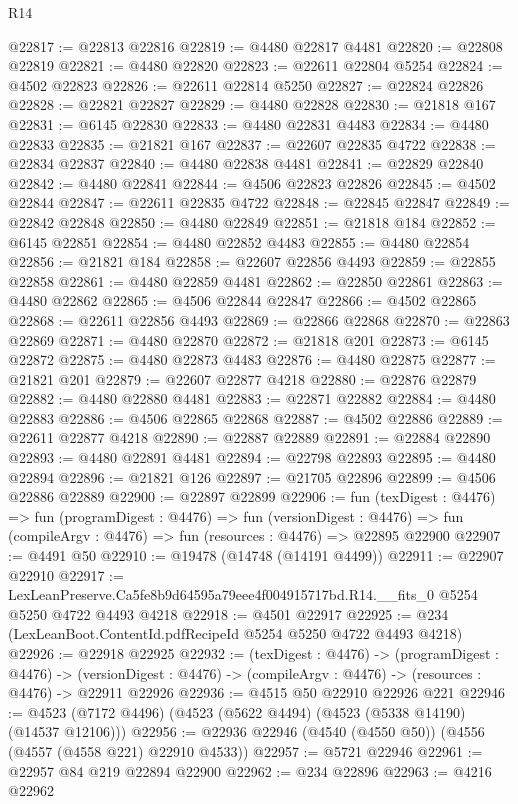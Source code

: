 \begin{lexlean}{R14}
\begin{coremodule}
@22817 := @22813 @22816
@22819 := @4480 @22817 @4481
@22820 := @22808 @22819
@22821 := @4480 @22820
@22823 := @22611 @22804 @5254
@22824 := @4502 @22823
@22826 := @22611 @22814 @5250
@22827 := @22824 @22826
@22828 := @22821 @22827
@22829 := @4480 @22828
@22830 := @21818 @167
@22831 := @6145 @22830
@22833 := @4480 @22831 @4483
@22834 := @4480 @22833
@22835 := @21821 @167
@22837 := @22607 @22835 @4722
@22838 := @22834 @22837
@22840 := @4480 @22838 @4481
@22841 := @22829 @22840
@22842 := @4480 @22841
@22844 := @4506 @22823 @22826
@22845 := @4502 @22844
@22847 := @22611 @22835 @4722
@22848 := @22845 @22847
@22849 := @22842 @22848
@22850 := @4480 @22849
@22851 := @21818 @184
@22852 := @6145 @22851
@22854 := @4480 @22852 @4483
@22855 := @4480 @22854
@22856 := @21821 @184
@22858 := @22607 @22856 @4493
@22859 := @22855 @22858
@22861 := @4480 @22859 @4481
@22862 := @22850 @22861
@22863 := @4480 @22862
@22865 := @4506 @22844 @22847
@22866 := @4502 @22865
@22868 := @22611 @22856 @4493
@22869 := @22866 @22868
@22870 := @22863 @22869
@22871 := @4480 @22870
@22872 := @21818 @201
@22873 := @6145 @22872
@22875 := @4480 @22873 @4483
@22876 := @4480 @22875
@22877 := @21821 @201
@22879 := @22607 @22877 @4218
@22880 := @22876 @22879
@22882 := @4480 @22880 @4481
@22883 := @22871 @22882
@22884 := @4480 @22883
@22886 := @4506 @22865 @22868
@22887 := @4502 @22886
@22889 := @22611 @22877 @4218
@22890 := @22887 @22889
@22891 := @22884 @22890
@22893 := @4480 @22891 @4481
@22894 := @22798 @22893
@22895 := @4480 @22894
@22896 := @21821 @126
@22897 := @21705 @22896
@22899 := @4506 @22886 @22889
@22900 := @22897 @22899
@22906 := fun (texDigest : @4476) =>
  fun (programDigest : @4476) =>
  fun (versionDigest : @4476) =>
  fun (compileArgv : @4476) => fun (resources : @4476) => @22895 @22900
@22907 := @4491 @50
@22910 := @19478 (@14748 (@14191 @4499))
@22911 := @22907 @22910
@22917 := LexLeanPreserve.Ca5fe8b9d64595a79eee4f004915717bd.R14.__fits_0
    @5254
    @5250
    @4722
    @4493
    @4218
@22918 := @4501 @22917
@22925 := @234 (LexLeanBoot.ContentId.pdfRecipeId @5254 @5250 @4722 @4493 @4218)
@22926 := @22918 @22925
@22932 := (texDigest : @4476) ->
  (programDigest : @4476) ->
  (versionDigest : @4476) -> (compileArgv : @4476) -> (resources : @4476) -> @22911 @22926
@22936 := @4515 @50 @22910 @22926 @221
@22946 := @4523 (@7172 @4496) (@4523 (@5622 @4494) (@4523 (@5338 @14190) (@14537 @12106)))
@22956 := @22936 @22946 (@4540 (@4550 @50)) (@4556 (@4557 (@4558 @221) @22910 @4533))
@22957 := @5721 @22946
@22961 := @22957 @84 @219 @22894 @22900
@22962 := @234 @22896
@22963 := @4216 @22962

\end{coremodule}
\end{lexlean}
